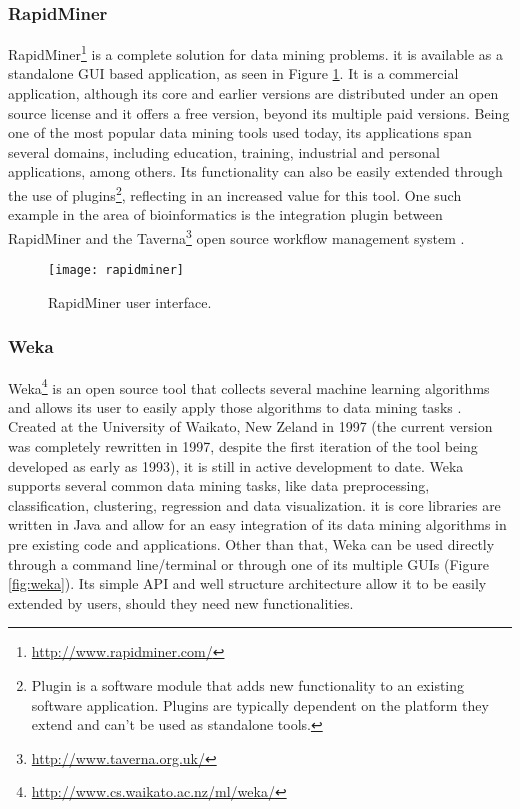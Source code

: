 \subsubsection*{RapidMiner}

RapidMiner\footnote{\url{http://www.rapidminer.com/}} is a complete solution for
data mining problems. it is available as a standalone GUI based application, as
seen in Figure \ref{fig:rapidminer}. It is a commercial application, although
its core and earlier versions are distributed under an open source license and
it offers a free version, beyond its multiple paid versions. Being one of the
most popular data mining tools used today, its applications span several
domains, including education, training, industrial and personal applications,
among others. Its functionality can also be easily extended through the use of
plugins\footnote{Plugin is a software module that adds new functionality to an
existing software application. Plugins are typically dependent on the platform
they extend and can't be used as standalone tools.}, reflecting in an increased
value for this tool. One such example in the area of bioinformatics is the
integration plugin between RapidMiner and the
Taverna\footnote{\url{http://www.taverna.org.uk/}} open source workflow
management system \cite{Jupp2011}.

\begin{figure}[!htb]
  \begin{center}
    \leavevmode
    \texttt{[image: rapidminer]}
    \caption[RapidMiner user interface]{RapidMiner user interface.}
    \label{fig:rapidminer}
  \end{center}
\end{figure}

\subsubsection*{Weka}

Weka\footnote{\url{http://www.cs.waikato.ac.nz/ml/weka/}} is an open source tool that
collects several machine learning algorithms and allows its user to easily apply
those algorithms to data mining tasks \cite{Hall}. Created at the University of
Waikato, New Zeland in 1997 (the current version was completely rewritten in
1997, despite the first iteration of the tool being developed as early as 1993),
it is still in active development to date. Weka supports several common data
mining tasks, like data preprocessing, classification, clustering, regression
and data visualization. it is core libraries are written in Java and allow for an
easy integration of its data mining algorithms in pre existing code and
applications. Other than that, Weka can be used directly through a command
line/terminal or through one of its multiple GUIs (Figure \ref{fig:weka}). Its
simple API and well structure architecture allow it to be easily extended by
users, should they need new functionalities.

